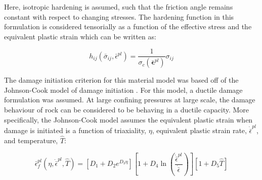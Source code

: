 





Here, isotropic hardening is assumed, such that the friction angle remains constant with respect to changing stresses. The hardening function in this formulation is considered tensorially as a function of the effective stress and the equivalent plastic strain which can be written as:

\begin{equation}
h_{ij}\left(\bar{\sigma}_{ij},\bar{\epsilon}^{pl}\right)=\frac{1}{\sigma_c\left(\bar{\boldsymbol{\epsilon}}^{pl}\right)}\sigma_{ij}
\label{eqn:druc6}
\end{equation}






The damage initiation criterion for this material model was based off of the Johnson-Cook model of damage initiation \cite{Johnson_1985}. For this model, a ductile damage formulation was assumed. At large confining pressures at large scale, the damage behaviour of rock can be considered to be behaving in a ductile capacity. More specifically, the Johnson-Cook model assumes the equivalent plastic strain when damage is initiated is a function of triaxiality, $\eta$, equivalent plastic strain rate, $\dot{\bar{\epsilon}}^{pl}$, and temperature, $\hat{T}$:

\begin{equation}
\bar{\epsilon}_{f}^{pl}\left(\eta,\dot{\bar{\epsilon}}^{pl},\hat{T}\right)=\left[D_{1}+D_{2}e^{D_{3}\eta}\right]\left[1+D_{4}\ln\left(\frac{\dot{\bar{\epsilon}}^{pl}}{\dot{\bar{\epsilon}}}\right)\right]\left[1+D_{5}\hat{T}\right]\label{eqn:druc7}
\end{equation}

